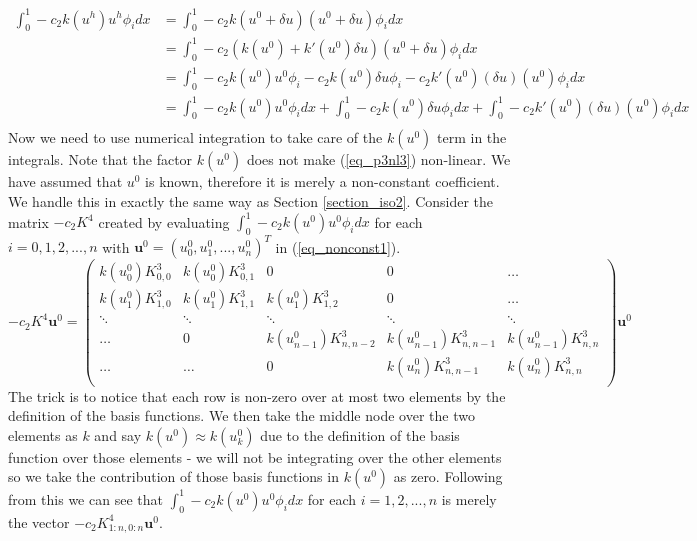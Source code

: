 \documentclass[11pt,fleqn]{article}
\theoremstyle{defstyle}
\begin{document}
\begin{equation}
\begin{aligned}
\int_0^1  -c_2k(u^h)u^h\phi_idx &= \int_0^1  -c_2k(u^0 + \delta u)(u^0 + \delta u)\phi_idx \\
& = \int_0^1  -c_2\left(k(u^0) + k\prime(u^0)\delta u\right)(u^0 + \delta u)\phi_idx \\
&= \int_0^1  -c_2k(u^0)u^0\phi_i -c_2k(u^0)\delta u\phi_i -c_2 k\prime(u^0)(\delta u )(u^0) \phi_i dx \\
&= \int_0^1  -c_2k(u^0)u^0\phi_i dx + \int_0^1 -c_2k(u^0)\delta u\phi_idx + \int_0^1 -c_2 k\prime(u^0)(\delta u )(u^0) \phi_i dx \\
\end{aligned}
\label{eq_p3nl3}
\end{equation}
Now we need to use numerical integration to take care of the $k(u^0)$ term in the integrals. Note that the factor $k(u^0)$ does not make (\ref{eq_p3nl3}) non-linear. We have assumed that $u^0$ is known, therefore it is merely a non-constant coefficient. We handle this in exactly the same way as Section \ref{section_iso2}. Consider the matrix $-c_2K^4$ created by  evaluating $\int_0^1  -c_2k(u^0)u^0\phi_i dx$ for each $i=0,1,2,...,n$  with $\mathbf{u}^0 = \left(u^0_0,u^0_1,...,u^0_n\right)^T$ in (\ref{eq_nonconst1}).
\begin{equation}
-c_2K^4\mathbf{u}^0 = \begin{pmatrix}
k(u^0_0)K^3_{0,0} & k(u^0_0)K^3_{0,1} & 0 & 0 & \hdots  \\
k(u^0_1)K^3_{1,0} & k(u^0_1)K^3_{1,1} & k(u^0_1)K^3_{1,2} &0& \hdots\\
\ddots & \ddots & \ddots & \ddots & \ddots \\  
\hdots & 0 & k(u^0_{n-1})K^3_{n,n-2} & k(u^0_{n-1})K^3_{n,n-1} & k(u^0_{n-1})K^3_{n,n}\\
\hdots & \hdots & 0 & k(u^0_{n})K^3_{n,n-1} & k(u^0_{n})K^3_{n,n}\\
\end{pmatrix}\mathbf{u}^0
\label{eq_nonconst1}
\end{equation}
The trick is to notice that each row is non-zero over at most two elements by the definition of the basis functions. We then take the middle node over the two elements as $k$ and say $k(u^0) \approx k(u^0_k)$ due to the definition of the basis function over those elements - we will not be integrating over the other elements so we take the contribution of those basis functions in $k(u^0)$ as zero. Following from this we can see that $\int_0^1  -c_2k(u^0)u^0\phi_i dx$ for each $i=1,2,...,n$ is merely the vector $-c_2K^4_{1:n,0:n}\mathbf{u}^0$. 
\end{document}
